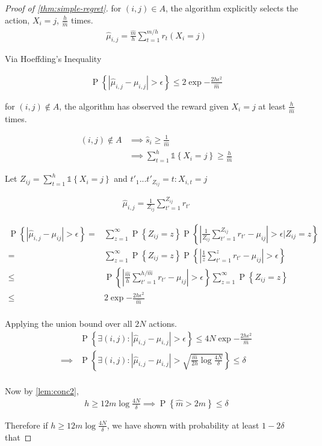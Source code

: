 \documentclass{article}
\newcommand{\set}[1]{\left\{#1\right\}}
\newcommand{\ind}[1]{\mathds{1}\!\!\set{#1}}
\newcommand{\eq}[1]{\begin{align*}#1\end{align*}}
\renewcommand{\P}[1]{\operatorname{P}\left\{#1\right\}}
\theoremstyle{plain}
\theoremstyle{definition}
\begin{document}
\begin{proof}[Proof of \cref{thm:simple-regret}]


for $(i,j)\in A$, the algorithm explicitly selects the action, $X_i = j$,  $\frac{h}{\hat m}$ times.
\eq {
\hat \mu_{i,j} = \frac{\hat m}{h} \sum_{t=1}^{\hat m/h} r_t(X_i = j)
}

Via Hoeffding's Inequality

\eq {
\P{ \left|\hat \mu_{i,j} - \mu_{i,j}\right| > \epsilon } \leq 2\exp{-\frac{2h\epsilon^2}{\hat{m}}}
}

for $(i,j)\notin A$, the algorithm has observed the reward given $X_i = j$ at least $\frac{h}{\hat m}$ times.

\eq {
(i,j)\notin A & \implies \hat{s}_i \geq \frac{1}{\hat m} \\
& \implies \sum_{t=1}^h \ind{X_i = j} \geq \frac{h}{\hat{m}}
}

Let  $Z_{ij} = \sum_{t=1}^h \ind{X_i = j}$ and $t'_1 ... t'_{Z_{ij}} = {t:X_{i,t} = j}$

\eq {
\hat \mu_{i,j} = \frac{1}{Z_{ij}}\sum_{t'=1}^{Z_{ij}}r_{t'}
}


\eq {
\P{\left| \hat \mu_{i,j} - \mu_{ij} \right| > \epsilon} = & \sum_{z=1}^\infty \P{Z_{ij}=z}\P{\left| \frac{1}{Z_{ij}} \sum_{t'=1}^{Z_{ij}}r_{t'} - \mu_{ij} \right| > \epsilon | Z_{ij} = z} \\
= & \sum_{z=1}^\infty \P{Z_{ij}=z}\P{\left| \frac{1}{z} \sum_{t'=1}^{z}r_{t'} - \mu_{ij} \right| > \epsilon } \\
\leq & \P{\left| \frac{\hat m}{h} \sum_{t'=1}^{h/\hat m}r_{t'} - \mu_{ij} \right| > \epsilon } \sum_{z=1}^\infty \P{Z_{ij}=z} \\
\leq & 2\exp{-\frac{2h\epsilon^2}{\hat{m}}}\\
}

Applying the union bound over all $2N$ actions.
\eq{
& \P{\exists (i,j): \left| \hat \mu_{i,j} - \mu_{i,j} \right| > \epsilon} \leq 4N\exp{-\frac{2h\epsilon^2}{\hat{m}}} \\
\implies & \P{\exists (i,j): \left| \hat \mu_{i,j} - \mu_{i,j} \right| > \sqrt{\frac{\hat m}{2h}\log{\frac{4N}{\delta}}}} \leq \delta \\
}

Now by \cref{lem:conc2}, 
\eq{
h \geq 12m \log \frac{4N}{\delta} \implies \P{\hat m > 2m} \leq \delta
} 

Therefore if $h \geq 12m \log \frac{4N}{\delta}$, we have shown with probability at least $1 - 2\delta$ that


\end{proof}
\end{document}
